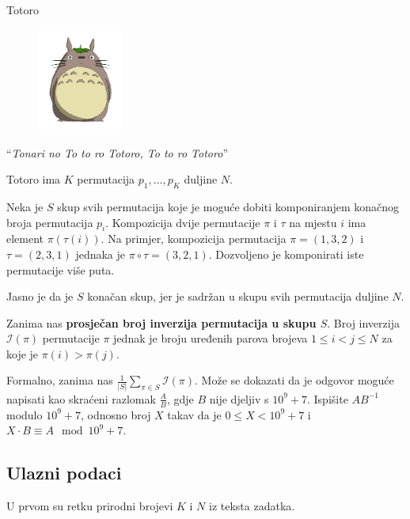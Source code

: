 \begin{statement}[
  problempoints=100,
  timelimit=1 sekunda,
  memorylimit=512 MiB,
]{Totoro}

\setlength\intextsep{-0.1cm}
\begin{figure}
\centering
\includegraphics[width=0.25\textwidth]{img/totoro.png}
\end{figure}

``\textit{Tonari no To to ro Totoro, To to ro Totoro}'' 

Totoro ima $K$ permutacija $p_1, \ldots, p_K$ duljine $N$.

Neka je $S$ skup svih permutacija koje je moguće
dobiti komponiranjem konačnog broja permutacija $p_i$. 
Kompozicija dvije permutacije $\pi$ i $\tau$ 
na mjestu $i$ ima element $\pi(\tau(i))$. Na primjer, 
kompozicija permutacija $\pi = (1, 3, 2)$
i $\tau = (2, 3, 1)$ jednaka je $\pi \circ \tau = (3, 2, 1)$. 
Dozvoljeno je komponirati iste permutacije više puta.

Jasno je da je $S$ konačan skup, jer je sadržan u skupu svih
permutacija duljine $N$.

Zanima nas \textbf{prosječan broj inverzija permutacija u skupu $S$}.
Broj inverzija $\mathcal{I}(\pi)$ permutacije $\pi$ 
jednak je broju uređenih parova
brojeva $1 \le i < j \le N$ za koje je $\pi(i) > \pi(j)$.

Formalno, zanima nas $\frac{1}{|S|} \sum_{\pi \in S} \mathcal{I} (\pi)$.
Može se dokazati da je odgovor moguće napisati
kao skraćeni razlomak $\frac{A}{B}$, gdje $B$ nije djeljiv s $10^9 + 7$. 
Ispišite $AB^{-1}$ modulo $10^9 + 7$, odnosno broj $X$ takav da je
$0 \leq X < 10^9 + 7$ i $X \cdot B \equiv A \mod 10^9 + 7$.

\subsection*{Ulazni podaci}
U prvom su retku prirodni brojevi $K$ i $N$ iz teksta zadatka.


\end{statement}
